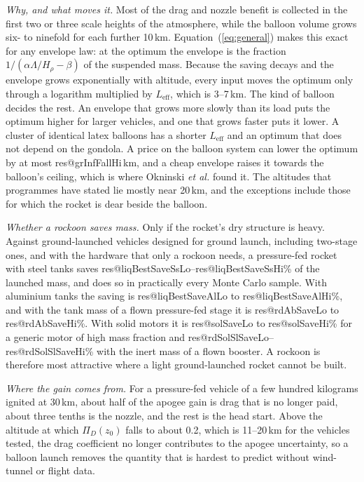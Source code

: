 \documentclass[11pt,a4paper]{article}
\makeatletter
\newcommand{\R}[1]{\csname res@#1\endcsname}
\makeatother
\begin{document}
\emph{Why, and what moves it.} Most of the drag and nozzle benefit is collected in the first two or three scale heights of the atmosphere, while the balloon volume grows six- to ninefold for each further 10\,km. Equation~(\ref{eq:general}) makes this exact for any envelope law: at the optimum the envelope is the fraction $1/(\alpha\Lambda/H_\rho-\beta)$ of the suspended mass. Because the saving decays and the envelope grows exponentially with altitude, every input moves the optimum only through a logarithm multiplied by $L_{\mathrm{eff}}$, which is 3--7\,km. The kind of balloon decides the rest. An envelope that grows more slowly than its load puts the optimum higher for larger vehicles, and one that grows faster puts it lower. A cluster of identical latex balloons has a shorter $L_{\mathrm{eff}}$ and an optimum that does not depend on the gondola. A price on the balloon system can lower the optimum by at most \R{grInfFallHi}\,km, and a cheap envelope raises it towards the balloon's ceiling, which is where Okninski \emph{et al.} \cite{okninski2016} found it. The altitudes that programmes have stated lie mostly near 20\,km, and the exceptions include those for which the rocket is dear beside the balloon.

\emph{Whether a rockoon saves mass.} Only if the rocket's dry structure is heavy. Against ground-launched vehicles designed for ground launch, including two-stage ones, and with the hardware that only a rockoon needs, a pressure-fed rocket with steel tanks saves \R{liqBestSaveSsLo}--\R{liqBestSaveSsHi}\% of the launched mass, and does so in practically every Monte Carlo sample. With aluminium tanks the saving is \R{liqBestSaveAlLo} to \R{liqBestSaveAlHi}\%, and with the tank mass of a flown pressure-fed stage it is \R{rdAbSaveLo} to \R{rdAbSaveHi}\%. With solid motors it is \R{solSaveLo} to \R{solSaveHi}\% for a generic motor of high mass fraction and \R{rdSolSlSaveLo}--\R{rdSolSlSaveHi}\% with the inert mass of a flown booster. A rockoon is therefore most attractive where a light ground-launched rocket cannot be built.

\emph{Where the gain comes from.} For a pressure-fed vehicle of a few hundred kilograms ignited at 30\,km, about half of the apogee gain is drag that is no longer paid, about three tenths is the nozzle, and the rest is the head start. Above the altitude at which $\Pi_D(z_0)$ falls to about 0.2, which is 11--20\,km for the vehicles tested, the drag coefficient no longer contributes to the apogee uncertainty, so a balloon launch removes the quantity that is hardest to predict without wind-tunnel or flight data.
\end{document}
